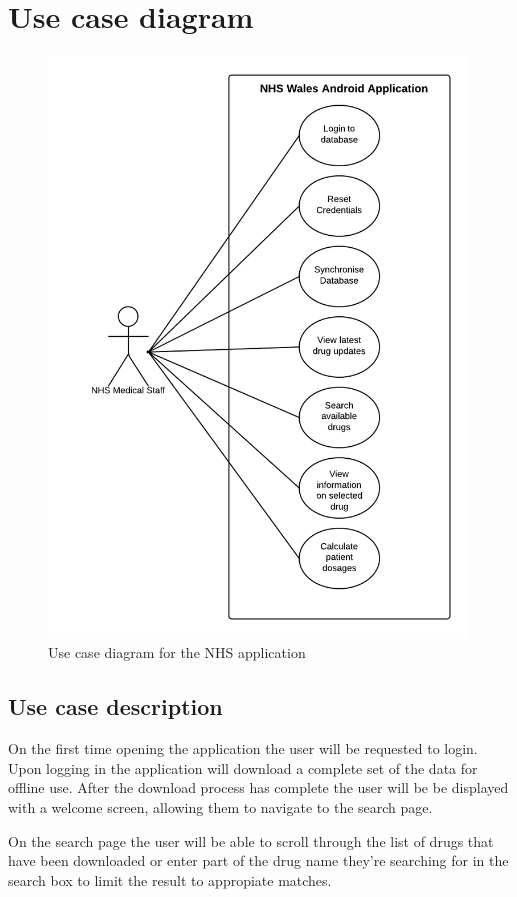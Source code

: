 \documentclass[11pt,fleqn,twoside]{article}
\begin{document}
\section{Use case diagram}
\begin{figure}[H]
\centering
\includegraphics[width=4.4in]{useCase}
\caption{Use case diagram for the NHS application}
\end{figure}

\subsection{Use case description}
On the first time opening the application the user will be requested to login. Upon logging in the application will download a complete set of the data for offline use. After the download process has complete the user will be be displayed with a welcome screen, allowing them to navigate to the search page. 

On the search page the user will be able to scroll through the list of drugs that have been downloaded or enter part of the drug name they're searching for in the search box to limit the result to appropiate matches.
\end{document}
